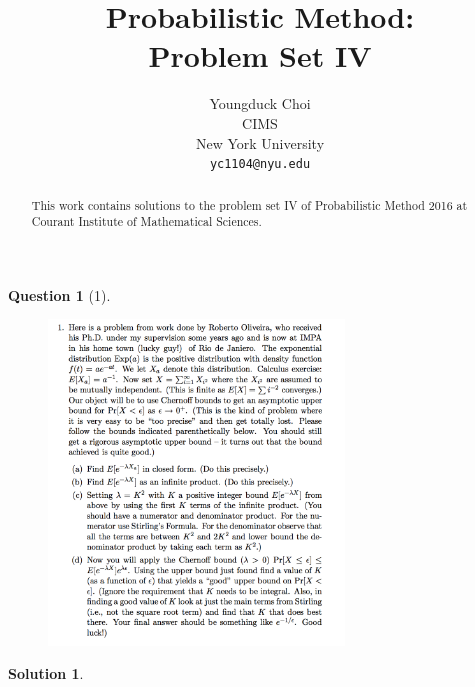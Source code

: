 \documentclass{article} %
\title{Probabilistic Method: \\
Problem Set IV}
\author{
Youngduck Choi \\
CIMS \\
New York University\\
\texttt{yc1104@nyu.edu} \\
}
\theoremstyle{quest}
\newtheorem*{question}{Question}
\newtheorem*{solution}{Solution}
\begin{document}
\maketitle

\begin{abstract}
This work contains solutions to the problem set IV
of Probabilistic Method 2016 at Courant Institute of Mathematical Sciences.
\end{abstract}

\bigskip

\begin{question}[1]
\hfill
\begin{figure}[h!]
  \centering
    \includegraphics[width=0.7\textwidth]{PM-4-1.png}
\end{figure}
\end{question}
\newpage
\begin{solution}
\end{solution}

\newpage
\end{document}
